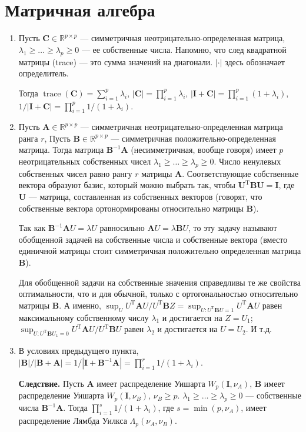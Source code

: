 \documentclass[12 pt]{article}
\DeclareMathOperator{\trace}{trace}
\begin{document}
\section{Матричная алгебра}
\begin{enumerate}
\item
Пусть $\mathbf{C}\in \mathbb{R}^{p\times p}$ --- симметричная неотрицательно-определенная матрица,
$\lambda_1\ge \ldots \ge \lambda_p\ge 0$ --- ее собственные числа. Напомню, что след квадратной матрицы (trace) ---
это сумма значений на диагонали. $|\cdot|$ здесь обозначает определитель.

Тогда $\trace(\mathbf{C})=\sum_{i=1}^p \lambda_i$, $|\mathbf{C}|=\prod_{i=1}^p \lambda_i$,
$|\mathbf{I}+\mathbf{C}|= \prod_{i=1}^p (1+\lambda_i)$,
$1/|\mathbf{I}+\mathbf{C}|= \prod_{i=1}^p 1/(1+\lambda_i)$.

\item
Пусть $\mathbf{A}\in \mathbb{R}^{p\times p}$ --- симметричная неотрицательно-определенная матрица ранга $r$,
Пусть $\mathbf{B}\in \mathbb{R}^{p\times p}$ --- симметричная положительно-определенная матрица.
Тогда матрица $\mathbf{B}^{-1}\mathbf{A}$ (несимметричная, вообще говоря) имеет $p$ неотрицательных
собственных чисел $\lambda_1\ge \ldots \ge \lambda_p\ge 0$. Число ненулевых собственных чисел равно
рангу $r$ матрицы $\mathbf{A}$. Соответствующие собственные вектора образуют базис,
который можно выбрать так, чтобы $\mathbf{U}^\mathrm{T}\mathbf{B}\mathbf{U} = \mathbf{I}$,
где $\mathbf{U}$ --- матрица, составленная из собственных векторов (говорят, что собственные вектора ортонормированы
относительно матрицы $\mathbf{B}$).

Так как $\mathbf{B}^{-1}\mathbf{A} U = \lambda U$ равносильно $\mathbf{A} U = \lambda \mathbf{B} U$,
то эту задачу называют обобщенной задачей на собственные числа и собственные вектора (вместо единичной матрицы стоит симметричная положительно
определенная матрица $\mathbf{B}$).

Для обобщенной задачи на собственные значения справедливы те же свойства оптимальности,
что и  для обычной, только с ортогональностью относительно матрицы $\mathbf{B}$.
А именно, $\sup_U   U^\mathrm{T}\mathbf{A}U/U^\mathrm{T}\mathbf{B}Z = \sup_{U: U^\mathrm{T}\mathbf{B}U = 1} U^\mathrm{T}\mathbf{A}U$
равен максимальному собственному числу $\lambda_1$ и достигается на $Z=U_1$;
$\sup_{U: U^\mathrm{T}\mathbf{B}U_1 = 0}   U^\mathrm{T}\mathbf{A}U/U^\mathrm{T}\mathbf{B}U$
равен $\lambda_2$ и достигается на $U=U_2$. И т.д.

\item
\label{item:3}
В условиях предыдущего пункта,
$|\mathbf{B}|/|\mathbf{B}+\mathbf{A}| = 1/|\mathbf{I}+\mathbf{B}^{-1}\mathbf{A}| = \prod_{i=1}^r 1/(1+\lambda_i)$.

\textbf{Следствие.} Пусть $\mathbf{A}$ имеет распределение Уишарта $W_p(\mathbf{I}, \nu_A)$, $\mathbf{B}$ имеет распределение Уишарта $W_p(\mathbf{I}, \nu_B)$,
$\nu_B \ge p$.
$\lambda_1\ge \ldots \ge \lambda_p\ge 0$ --- собственные числа $\mathbf{B}^{-1}\mathbf{A}$.
Тогда $\prod_{i=1}^s 1/(1+\lambda_i)$, где $s=\min(p,{\nu_A})$, имеет распределение Лямбда Уилкса $\Lambda_p(\nu_A, \nu_B)$.
\end{enumerate}
\end{document}
